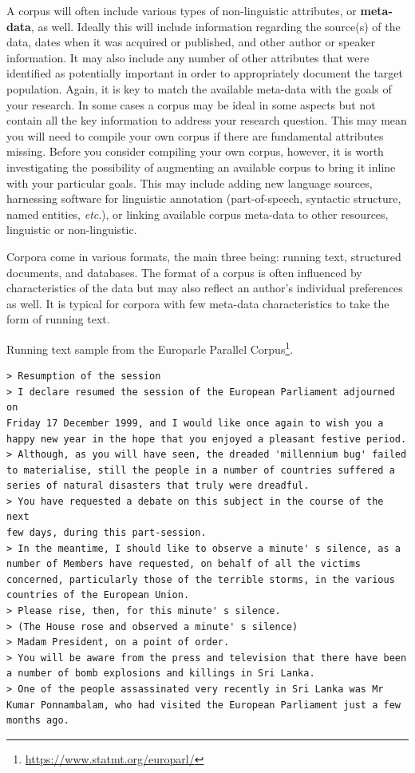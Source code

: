 \documentclass[
  letterpaper,
]{latex/krantz}
\DeclareRobustCommand{\href}[2]{#2\footnote{\url{#1}}}
\begin{document}
A corpus will often include various types of non-linguistic attributes,
or \textbf{meta-data}, as well. Ideally this will
include information regarding the source(s) of the data, dates when it
was acquired or published, and other author or speaker information. It
may also include any number of other attributes that were identified as
potentially important in order to appropriately document the target
population. Again, it is key to match the available meta-data with the
goals of your research. In some cases a corpus may be ideal in some
aspects but not contain all the key information to address your research
question. This may mean you will need to compile your own corpus if
there are fundamental attributes missing. Before you consider compiling
your own corpus, however, it is worth investigating the possibility of
augmenting an available corpus to bring it inline with your particular
goals. This may include adding new language sources, harnessing software
for linguistic annotation (part-of-speech, syntactic structure, named
entities, \emph{etc}.), or linking available corpus meta-data to other
resources, linguistic or non-linguistic.

Corpora come in various formats, the main three being: running text,
structured documents, and databases. The format of a corpus is often
influenced by characteristics of the data but may also reflect an
author's individual preferences as well. It is typical for corpora with
few meta-data characteristics to take the form of running text.

Running text sample from the
\href{https://www.statmt.org/europarl/}{Europarle Parallel Corpus}.

\begin{verbatim}
> Resumption of the session
> I declare resumed the session of the European Parliament adjourned on
Friday 17 December 1999, and I would like once again to wish you a
happy new year in the hope that you enjoyed a pleasant festive period.
> Although, as you will have seen, the dreaded 'millennium bug' failed
to materialise, still the people in a number of countries suffered a
series of natural disasters that truly were dreadful.
> You have requested a debate on this subject in the course of the next
few days, during this part-session.
> In the meantime, I should like to observe a minute' s silence, as a
number of Members have requested, on behalf of all the victims
concerned, particularly those of the terrible storms, in the various
countries of the European Union.
> Please rise, then, for this minute' s silence.
> (The House rose and observed a minute' s silence)
> Madam President, on a point of order.
> You will be aware from the press and television that there have been
a number of bomb explosions and killings in Sri Lanka.
> One of the people assassinated very recently in Sri Lanka was Mr
Kumar Ponnambalam, who had visited the European Parliament just a few
months ago.
\end{verbatim}
\end{document}
